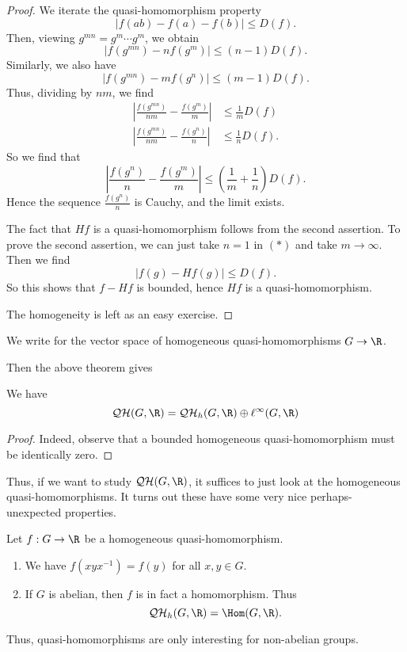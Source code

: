 \documentclass[a4paper]{article}
\newcommand\QH{\mathcal{QH}}
\begin{document}
\begin{proof}
  We iterate the quasi-homomorphism property
  \[
    |f(ab) - f(a) - f(b)| \leq D(f).
  \]
  Then, viewing $g^{mn} = g^m \cdots g^m$, we obtain
  \[
    |f(g^{mn}) - n f(g^m)| \leq (n - 1) D(f).
  \]
  Similarly, we also have
  \[
    |f(g^{mn}) -m f(g^n)| \leq (m - 1) D(f).
  \]
  Thus, dividing by $nm$, we find
  \begin{align*}
    \left|\frac{f(g^{mn})}{nm} - \frac{f(g^m)}{m}\right| &\leq \frac{1}{m} D(f)\\
    \left|\frac{f(g^{mn})}{nm} - \frac{f(g^n)}{n}\right| &\leq \frac{1}{n} D(f).
  \end{align*}
  So we find that
  \[
    \left|\frac{f(g^n)}{n} - \frac{f(g^m)}{m}\right| \leq \left(\frac{1}{m} + \frac{1}{n} \right) D(f).\tag{$*$}
  \]
  Hence the sequence $\frac{f(g^n)}{n}$ is Cauchy, and the limit exists.

  The fact that $Hf$ is a quasi-homomorphism follows from the second assertion. To prove the second assertion, we can just take $n = 1$ in $(*)$ and take $m \to \infty$. Then we find
  \[
    |f(g) - Hf(g)| \leq D(f).
  \]
  So this shows that $f - Hf$ is bounded, hence $Hf$ is a quasi-homomorphism.

  The homogeneity is left as an easy exercise.
\end{proof}

\begin{notation}
  We write \term{$\QH_h(G, \R)$} for the vector space of homogeneous quasi-homomorphisms $G \to \R$.
\end{notation}

Then the above theorem gives
\begin{cor}
  We have
  \[
    \QH(G, \R) = \QH_h(G, \R) \oplus \ell^\infty(G, \R)
  \]
\end{cor}

\begin{proof}
  Indeed, observe that a bounded homogeneous quasi-homomorphism must be identically zero.
\end{proof}

Thus, if we want to study $\QH(G, \R)$, it suffices to just look at the homogeneous quasi-homomorphisms. It turns out these have some very nice perhaps-unexpected properties.
\begin{lemma}
  Let $f: G \to \R$ be a homogeneous quasi-homomorphism.
  \begin{enumerate}
    \item We have $f(xyx^{-1}) = f(y)$ for all $x, y \in G$.
    \item If $G$ is abelian, then $f$ is in fact a homomorphism. Thus
      \[
        \QH_h(G, \R) = \Hom(G, \R).
      \]
  \end{enumerate}
\end{lemma}
Thus, quasi-homomorphisms are only interesting for non-abelian groups.
\end{document}
